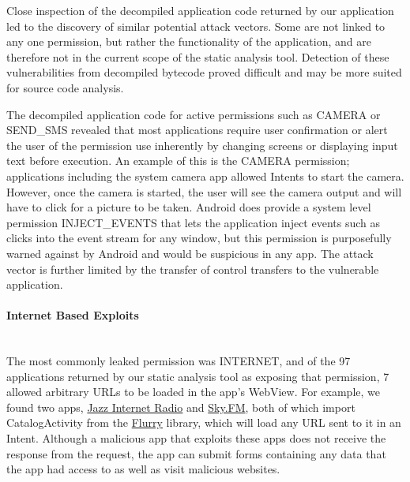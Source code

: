 \documentclass[12pt,a4paper]{article}
\begin{document}
Close inspection of the decompiled application code returned by our application
led to the discovery of similar potential attack vectors. Some are not linked
to any one permission, but rather the functionality of the application, and are
therefore not in the current scope of the static analysis tool. Detection of
these vulnerabilities from decompiled bytecode proved difficult and may be more
suited for source code analysis. 

The decompiled application code for active permissions such as CAMERA or\\
SEND\_SMS revealed that most applications require user confirmation or alert the
user of the permission use inherently by changing screens or displaying input
text before execution. An example of this is the CAMERA permission; applications
including the system camera app allowed Intents to start the camera. However,
once the camera is started, the user will see the camera output and will have to
click for a picture to be taken. Android does provide a system level permission
INJECT\_EVENTS that lets the application inject events such as clicks into the
event stream for any window, but this permission is purposefully warned against
by Android and would be suspicious in any app. The attack vector is further
limited by the transfer of control transfers to the vulnerable application.

\paragraph{Internet Based Exploits} ~\\
The most commonly leaked permission was INTERNET, and of the 97 applications
returned by our static analysis tool as exposing that permission, 7 allowed
arbitrary URLs to be loaded in the app's WebView. For example, we found two
apps,
\href{https://play.google.com/store/apps/details?id=com.audioaddict.jr\&feature=search\_result#?t=W251bGwsMSwxLDEsImNvbS5hdWRpb2FkZGljdC5qciJd}{Jazz
Internet Radio} and
\href{https://play.google.com/store/apps/details?id=com.audioaddict.sky\&feature=search\_result#?t=W251bGwsMSwxLDEsImNvbS5hdWRpb2FkZGljdC5za3kiXQ..}{Sky.FM},
both of which import CatalogActivity from the
\href{http://support.flurry.com/index.php?title=AppCircle/GettingStarted/Android/TechnicalQuickStart}{Flurry}
library, which will load any URL sent to it in an Intent. Although a malicious
app that exploits these apps does not receive the response from the request, the
app can submit forms containing any data that the app had access to as well as
visit malicious websites. 
\end{document}
